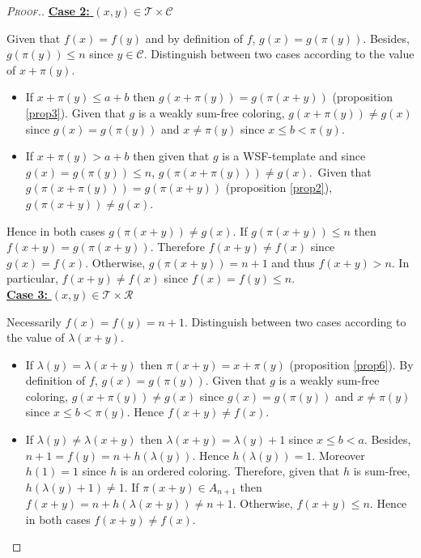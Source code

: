 \begin{proof}[\textsc{Proof.}]
\noindent \underline{\textbf{Case 2:} \((x,y) \in \mathcal{T} \times \mathcal{C}\)}
\par
Given that \(f(x) = f(y)\) and by definition of \(f\), \(g(x) = g(\pi(y))\). Besides, \(g(\pi(y)) \leqslant n\) since 
\(y \in \mathcal{C}\). Distinguish between two cases according to the value of \(x + \pi(y)\).
\begin{itemize}
\item \begin{sloppypar}
	If \(x + \pi(y) \leqslant a + b\) then \(g(x + \pi(y)) = g(\pi(x + y))\) (proposition \ref{prop3}). Given that \(g\) is 
	a weakly sum-free coloring, \(g(x+\pi(y)) \neq g(x)\) since \(g(x)=g(\pi(y))\) and \(x \neq \pi(y)\) since
	\({x \leqslant b < \pi(y)}\).
	\end{sloppypar}
\item \begin{sloppypar}
	If \(x+\pi(y)> a+b\) then given that \(g\) is a WSF-template and since \({g(x) = g(\pi(y)) \leqslant n}\), 
	\({g(\pi(x+\pi(y))) \neq g(x)}\).~Given that \({g(\pi(x+\pi(y))) = g(\pi(x+y))}\) (proposition \ref{prop2}), 
	\({g(\pi(x+ y)) \neq g(x)}\).
	\end{sloppypar}
\end{itemize}
\par
Hence in both cases \(g(\pi(x+y)) \neq g(x)\). If  \(g(\pi(x+y)) \leqslant n\) then \(f(x+y) = g(\pi(x+y))\). Therefore 
\(f(x+y) \neq f(x)\) since \(g(x) = f(x)\). Otherwise, \(g(\pi(x+y)) = n + 1\) and thus \(f(x+y) > n\). In particular, 
\(f(x + y) \neq f(x)\) since \(f(x) = f(y) \leqslant n\). \\

\noindent \underline{\textbf{Case 3:} \((x,y) \in \mathcal{T} \times \mathcal{R}\)}
\par
Necessarily \(f(x) = f(y) = n + 1\). Distinguish between two cases according to the value of \(\lambda(x+y)\).
\begin{itemize}
\item If \(\lambda(y)=\lambda(x+y)\) then \(\pi(x + y) = x + \pi(y)\) (proposition \ref{prop6}). By definition of 
	\(f\), \(g(x) = g(\pi(y))\). Given that \(g\) is a weakly sum-free coloring, \(g(x + \pi(y)) \neq g(x)\) since 
	\(g(x) = g(\pi(y))\) and \(x \neq \pi(y)\) since \({x \leqslant b < \pi(y)}\). Hence \(f(x + y) \neq f(x)\).
\item If \(\lambda(y) \neq \lambda(x + y)\) then \(\lambda(x + y) = \lambda(y) + 1\) since \(x \leqslant b < a\). 
	Besides, \(n + 1 = f(y) = n +  h(\lambda(y))\). Hence \(h(\lambda(y)) = 1\). Moreover \(h(1) = 1\) since \(h\) 
	is an ordered coloring. Therefore, given that \(h\) is sum-free, \(h(\lambda(y) + 1) \neq 1\). If \(\pi(x + y) \in 
	A_{n + 1}\) then \(f(x + y) = n + h(\lambda(x + y)) \neq n + 1\). Otherwise, \(f(x + y) \leqslant n\). Hence 
	in both cases \(f(x + y) \neq f(x)\).
\end{itemize}


\end{proof}
